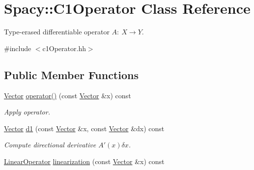 \hypertarget{classSpacy_1_1C1Operator}{\section{\-Spacy\-:\-:\-C1\-Operator \-Class \-Reference}
\label{classSpacy_1_1C1Operator}
}


\-Type-\/erased differentiable operator $A:\ X \to Y $.  




{\ttfamily \#include $<$c1\-Operator.\-hh$>$}

\subsection*{\-Public \-Member \-Functions}
\begin{DoxyCompactItemize}
\item 
\hypertarget{classSpacy_1_1C1Operator_a2a01bf08bf2b6e44955cd606aa3db91d}{\hyperlink{classSpacy_1_1Vector}{\-Vector} \hyperlink{classSpacy_1_1C1Operator_a2a01bf08bf2b6e44955cd606aa3db91d}{operator()} (const \hyperlink{classSpacy_1_1Vector}{\-Vector} \&x) const }\label{classSpacy_1_1C1Operator_a2a01bf08bf2b6e44955cd606aa3db91d}

\begin{DoxyCompactList}\small\item\em \-Apply operator. \end{DoxyCompactList}\item 
\hypertarget{classSpacy_1_1C1Operator_a1b6a06c88bc4168c750ee4ffdc81f1dd}{\hyperlink{classSpacy_1_1Vector}{\-Vector} \hyperlink{classSpacy_1_1C1Operator_a1b6a06c88bc4168c750ee4ffdc81f1dd}{d1} (const \hyperlink{classSpacy_1_1Vector}{\-Vector} \&x, const \hyperlink{classSpacy_1_1Vector}{\-Vector} \&dx) const }\label{classSpacy_1_1C1Operator_a1b6a06c88bc4168c750ee4ffdc81f1dd}

\begin{DoxyCompactList}\small\item\em \-Compute directional derivative $A'(x)\delta x$. \end{DoxyCompactList}\item 
\hypertarget{classSpacy_1_1C1Operator_a71aabe09ec29a8a1bb197eef035d6672}{\hyperlink{classSpacy_1_1LinearOperator}{\-Linear\-Operator} \hyperlink{classSpacy_1_1C1Operator_a71aabe09ec29a8a1bb197eef035d6672}{linearization} (const \hyperlink{classSpacy_1_1Vector}{\-Vector} \&x) const }\label{classSpacy_1_1C1Operator_a71aabe09ec29a8a1bb197eef035d6672}


\end{DoxyCompactItemize}
